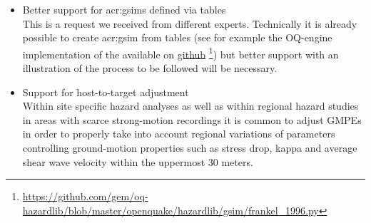 \begin{itemize}
    \item Better support for \glspl{acr:gsim} defined via tables \hfill \\
        This is a request we received from different experts. Technically it is
        already possible to create \gls{acr:gsim} from tables (see for example 
        the OQ-engine implementation of the \textcite{frankel1996} available
        on
        \href{https://github.com/gem/oq-hazardlib/blob/master/openquake/hazardlib/gsim/frankel_1996.py}{github}
        \footnote{
            \href{https://github.com/gem/oq-hazardlib/blob/master/openquake/hazardlib/gsim/frankel_1996.py}
        {https://github.com/gem/oq-hazardlib/blob/master/openquake/hazardlib/gsim/frankel\_1996.py}})
        but better support with an illustration of the process to be 
        followed will be necessary.
    \item Support for host-to-target adjustment \hfill \\
        Within site specific hazard analyses \citep[see for
        example][]{bommer2014} as well as within regional hazard studies in
        areas with scarce strong-motion recordings it is common to adjust GMPEs
        in order to properly take into account regional variations of parameters
        controlling ground-motion properties such as stress drop, kappa and
        average shear wave velocity within the uppermost 30 meters. 
        

\end{itemize}
